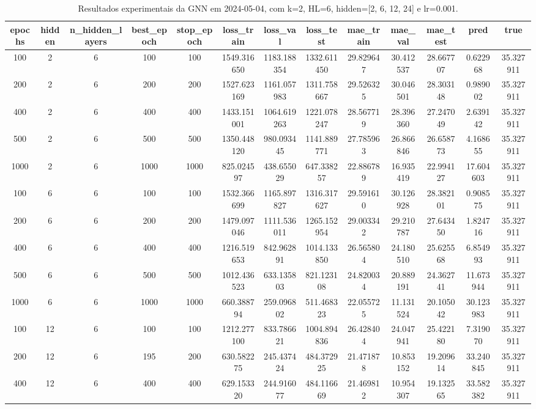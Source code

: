 \begin{table}[h]
\centering
\caption{Resultados experimentais da GNN em 2024-05-04, com k=2, HL=6, hidden=[2, 6, 12, 24] e lr=0.001.}
\label{tab:gnn_results_k2_hl6_d20240504}
\begin{tabular}{ccccccccccccc}
\toprule
epochs & hidden & n\_hidden\_layers & best\_epoch & stop\_epoch & loss\_train & loss\_val & loss\_test & mae\_train & mae\_val & mae\_test & pred & true \\
\midrule
100 & 2 & 6 & 100 & 100 & 1549.316650 & 1183.188354 & 1332.611450 & 29.829647 & 30.412537 & 28.667707 & 0.622968 & 35.327911 \\
200 & 2 & 6 & 200 & 200 & 1527.623169 & 1161.057983 & 1311.758667 & 29.526325 & 30.046501 & 28.303148 & 0.989002 & 35.327911 \\
400 & 2 & 6 & 400 & 400 & 1433.151001 & 1064.619263 & 1221.078247 & 28.567719 & 28.396360 & 27.247049 & 2.639142 & 35.327911 \\
500 & 2 & 6 & 500 & 500 & 1350.448120 & 980.093445 & 1141.889771 & 27.785963 & 26.866846 & 26.658773 & 4.168655 & 35.327911 \\
1000 & 2 & 6 & 1000 & 1000 & 825.024597 & 438.655029 & 647.338257 & 22.886789 & 16.935419 & 22.994127 & 17.604603 & 35.327911 \\
100 & 6 & 6 & 100 & 100 & 1532.366699 & 1165.897827 & 1316.317627 & 29.591610 & 30.126928 & 28.382101 & 0.908575 & 35.327911 \\
200 & 6 & 6 & 200 & 200 & 1479.097046 & 1111.536011 & 1265.152954 & 29.003342 & 29.210787 & 27.643450 & 1.824716 & 35.327911 \\
400 & 6 & 6 & 400 & 400 & 1216.519653 & 842.962891 & 1014.133850 & 26.565804 & 24.180510 & 25.625568 & 6.854993 & 35.327911 \\
500 & 6 & 6 & 500 & 500 & 1012.436523 & 633.135803 & 821.123108 & 24.820034 & 20.889191 & 24.362741 & 11.673944 & 35.327911 \\
1000 & 6 & 6 & 1000 & 1000 & 660.388794 & 259.096802 & 511.468323 & 22.055725 & 11.131524 & 20.105042 & 30.123983 & 35.327911 \\
100 & 12 & 6 & 100 & 100 & 1212.277100 & 833.786621 & 1004.894836 & 26.428404 & 24.047941 & 25.422180 & 7.319070 & 35.327911 \\
200 & 12 & 6 & 195 & 200 & 630.582275 & 245.437424 & 484.372925 & 21.471878 & 10.853152 & 19.209614 & 33.240845 & 35.327911 \\
400 & 12 & 6 & 400 & 400 & 629.153320 & 244.916077 & 484.116669 & 21.469812 & 10.954307 & 19.132565 & 33.582382 & 35.327911 \\

\end{tabular}
\end{table}
